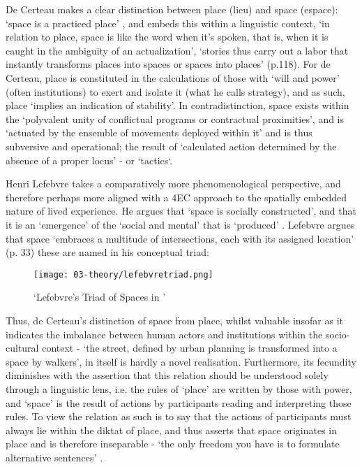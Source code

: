 De Certeau makes a clear distinction between place (lieu) and space (espace): `space is a practiced place' \citeyearpar[p. 117]{decerteau1984}, and embeds this within a linguistic context, `in relation to place, space is like the word when it's spoken, that is, when it is caught in the ambiguity of an actualization', `stories thus carry out a labor that instantly transforms places into spaces or spaces into places' (p.118). For de Certeau, place is constituted in the calculations of those with `will and power' (often institutions) to exert and isolate it (what he calls strategy), and as such, place `implies an indication of stability'. In contradistinction, space exists within the `polyvalent unity of conflictual programs or contractual proximities', and is `actuated by the ensemble of movements deployed within it' and is thus subversive and operational; the result of `calculated action determined by the absence of a proper locus' - or `tactics`. 

Henri Lefebvre takes a comparatively more phenomenological perspective, and therefore perhaps more aligned with a 4EC approach to the spatially embedded nature of lived experience. He argues that `space is socially constructed', and that it is an `emergence' of the `social and mental' that is `produced' \citeyearpar[p. 260]{lefebvre1991}. Lefebvre argues that space `embraces a multitude of intersections, each with its assigned location' (p. 33) these are named in his conceptual triad:

\begin{figure}[ht]
    \centering
    \texttt{[image: 03-theory/lefebvretriad.png]}
    \caption[`Lefebvre's Triad of Spaces in (Günzel, 2019, p.14)']{`Lefebvre's Triad of Spaces in \citep[p. 14]{gunzel2019}'}\label{fig: lefebvretriad}
\end{figure}

Thus, de Certeau's distinction of space from place, whilst valuable insofar as it indicates the imbalance between human actors and institutions within the socio-cultural context - `the street, defined by urban planning is transformed into a space by walkers', in itself is hardly a novel realisation. Furthermore, its fecundity diminishes with the assertion that this relation should be understood solely through a linguistic lens, i.e. the rules of `place' are written by those with power, and `space' is the result of actions by participants reading and interpreting those rules. To view the relation as such is to say that the actions of participants must always lie within the diktat of place, and thus asserts that space originates in place and is therefore inseparable - `the only freedom you have is to formulate alternative sentences' \citep{vermeulen2015}. 

